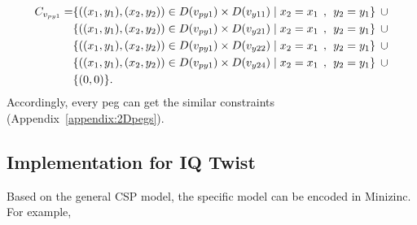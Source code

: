 \begin{equation}
\begin{aligned}  
C_{v_{py1}} = &\{((x_{1},y_{1}),(x_{2},y_{2}))\in D(v_{py1}) \times D(v_{y11})\mid x_{2} = x_{1} \hspace{1ex} , \hspace{1ex}  y_{2} = y_{1}\}\hspace{1ex} \cup  
\\&\{((x_{1},y_{1}),(x_{2},y_{2}))\in D(v_{py1}) \times D(v_{y21})\mid x_{2} = x_{1} \hspace{1ex} , \hspace{1ex}  y_{2} = y_{1}\}\hspace{1ex} \cup 
\\&\{ ((x_{1},y_{1}),(x_{2},y_{2}))\in D(v_{py1}) \times D(v_{y22})\mid x_{2} = x_{1} \hspace{1ex} , \hspace{1ex}  y_{2} = y_{1}\}\hspace{1ex}\cup 
\\& \{((x_{1},y_{1}),(x_{2},y_{2}))\in D(v_{py1}) \times D(v_{y24})\mid x_{2} = x_{1} \hspace{1ex} , \hspace{1ex}  y_{2} = y_{1}\} \hspace{1ex}\cup
\\& \{(0,0)\}.
\end{aligned}
\end{equation}
Accordingly, every peg can get the similar constraints (Appendix~\ref{appendix:2Dpegs}).
\subsection{Implementation for IQ Twist}
\label{section:implementation1}
Based on the general CSP model, the specific model can be encoded in Minizinc. For example, 

